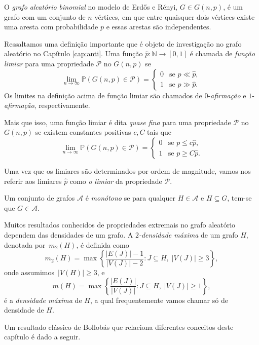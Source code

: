 \documentclass[12pt,a4paper]{book}
\let\subset\subseteq
\def\cP{{\mathcal P}}
\begin{document}
O \textit{grafo aleatório binomial} no modelo de Erd\H{o}s e Rényi, $G \in G(n, p)$, é um grafo com um conjunto de $n$ vértices, em que entre quaisquer dois vértices existe uma aresta com probabilidade $p$ e essas arestas são independentes.

Ressaltamos uma definição importante que é objeto de investigação no grafo aleatório no Capítulo \ref{cap:anti}.
Uma função $\hat{p}: \mathbb{N} \rightarrow [0,1]$ é chamada de \textit{função limiar} para uma propriedade
$\cP$ no $G(n,p)$ se 
\[
  \lim_{n\to\infty}\mathbb{P}\left(G(n,p) \in \cP\right)
  =
  \begin{cases}0&\text{se }p \ll \hat p, \\
    1&\text{se }p \gg \hat p.
  \end{cases}
\]
Os limites na definição acima de função limiar são chamados de $0$-\emph{afirmação} e $1$-\emph{afirmação}, respectivamente. 

Mais que isso, uma função limiar é dita \emph{quase fina} para uma propriedade
$\cP$ no $G(n,p)$ se existem constantes positivas $c,C$ tais que
\[
  \lim_{n\to\infty}\mathbb{P}\left(G(n,p) \in \cP\right)
  =
  \begin{cases}0&\text{se }p \leq c\hat p, \\
    1&\text{se }p \geq C\hat p.
  \end{cases}
\]

Uma vez que os limiares são determinados por ordem de magnitude, vamos nos referir aos limiares $\hat{p}$ como \emph{o limiar} da propriedade $\cP$.

Um conjunto de grafos $\mathcal{A}$ é \textit{monótono} se para qualquer $H \in \mathcal{A}$ e $H \subseteq G$, tem-se que $G \in \mathcal{A}$. 

Muitos resultados conhecidos de propriedades extremais no grafo aleatório dependem das densidades de um grafo.
A \emph{$2$-densidade máxima} de um grafo $H$, denotada por~$m_2(H)$, é definida como 
\begin{equation*}
  m_2(H)=\max\left\{\frac{|E(J)|-1}{|V(J)|-2}\colon J\subset H,\;|V(J)|\geq3\right\},
\end{equation*}
onde assumimos~$|V(H)|\geq3$, e 
\[
    m(H) = \max\left\{\frac{|E(J)|}{|V(J)|}\colon J\subset H,\;|V(J)|\geq1\right\},
\]
é a \emph{densidade máxima} de $H$, a qual frequentemente vamos chamar só de densidade de $H$.

Um resultado clássico de Bollobás que relaciona diferentes conceitos deste capítulo é dado a seguir.
\end{document}
